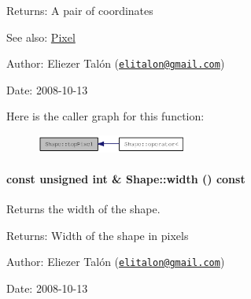 \begin{Desc}
\item[Returns:]A pair of coordinates\end{Desc}
\begin{Desc}
\item[See also:]\hyperlink{_shape_8hpp_535e59456e3e633842529cfa8ea103c4}{Pixel}\end{Desc}
\begin{Desc}
\item[Author:]Eliezer Talón (\href{mailto:elitalon@gmail.com}{\tt elitalon@gmail.com}) \end{Desc}
\begin{Desc}
\item[Date:]2008-10-13 \end{Desc}


Here is the caller graph for this function:\nopagebreak
\begin{figure}[H]
\begin{center}
\leavevmode
\includegraphics[width=141pt]{class_shape_063c4934d8c1cd4b02e4e3e4a604f62e_icgraph}
\end{center}
\end{figure}
\hypertarget{class_shape_6773dfedb96ef750e5469e22d51ecf0f}{
\paragraph[{width}]{\setlength{\rightskip}{0pt plus 5cm}const unsigned int \& Shape::width () const}\hfill}
\label{class_shape_6773dfedb96ef750e5469e22d51ecf0f}


Returns the width of the shape. 

\begin{Desc}
\item[Returns:]Width of the shape in pixels\end{Desc}
\begin{Desc}
\item[Author:]Eliezer Talón (\href{mailto:elitalon@gmail.com}{\tt elitalon@gmail.com}) \end{Desc}
\begin{Desc}
\item[Date:]2008-10-13 \end{Desc}
